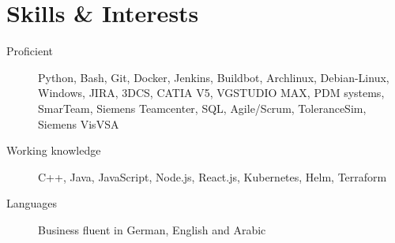 \documentclass[11pt]{article} %
\begin{document}
	\section{Skills \& Interests}
	\begin{description}%
		\item[Proficient] Python, Bash, Git, Docker, Jenkins, Buildbot, Archlinux, Debian-Linux, Windows, JIRA, 3DCS, CATIA V5, VGSTUDIO MAX, PDM systems, SmarTeam, Siemens Teamcenter, SQL, Agile/Scrum, ToleranceSim, Siemens VisVSA 
		\item[Working knowledge] C++, Java, JavaScript, Node.js, React.js, Kubernetes, Helm, Terraform
		\item[Languages] Business fluent in German, English and Arabic
	\end{description}
	
\end{document}
